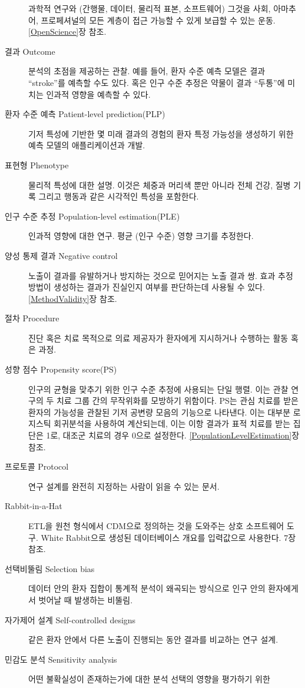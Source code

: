 \documentclass[10.5pt]{book}
\theoremstyle{definition}
\theoremstyle{definition}
\theoremstyle{definition}
\theoremstyle{remark}
\begin{document}
\begin{description}
과학적 연구와 (간행물, 데이터, 물리적 표본, 소프트웨어) 그것을 사회,
아마추어, 프로페셔널의 모든 계층이 접근 가능할 수 있게 보급할 수 있는
운동. \ref{OpenScience}장 참조.
\item[결과 Outcome]
분석의 초점을 제공하는 관찰. 예를 들어, 환자 수준 예측 모델은 결과
``stroke''를 예측할 수도 있다. 혹은 인구 수준 추정은 약물이 결과
``두통''에 미치는 인과적 영향을 예측할 수 있다.
\item[환자 수준 예측 Patient-level prediction(PLP)]
기저 특성에 기반한 몇 미래 결과의 경험의 환자 특정 가능성을 생성하기
위한 예측 모델의 애플리케이션과 개발.
\item[표현형 Phenotype]
물리적 특성에 대한 설명. 이것은 체중과 머리색 뿐만 아니라 전체 건강,
질병 기록 그리고 행동과 같은 시각적인 특성을 포함한다.
\item[인구 수준 추정 Population-level estimation(PLE)]
인과적 영향에 대한 연구. 평균 (인구 수준) 영향 크기를 추정한다.
\item[양성 통제 결과 Negative control]
노출이 결과를 유발하거나 방지하는 것으로 믿어지는 노출 결과 쌍. 효과
추정 방법이 생성하는 결과가 진실인지 여부를 판단하는데 사용될 수 있다.
\ref{MethodValidity}장 참조.
\item[절차 Procedure]
진단 혹은 치료 목적으로 의료 제공자가 환자에게 지시하거나 수행하는 활동
혹은 과정.
\item[성향 점수 Propensity score(PS)]
인구의 균형을 맞추기 위한 인구 수준 추정에 사용되는 단일 행렬. 이는 관찰
연구의 두 치료 그룹 간의 무작위화를 모방하기 위함이다. PS는 관심 치료를
받은 환자의 가능성을 관찰된 기저 공변량 모음의 기능으로 나타낸다. 이는
대부분 로지스틱 회귀분석을 사용하여 계산되는데, 이는 이항 결과가 표적
치료를 받는 집단은 1로, 대조군 치료의 경우 0으로 설정한다.
\ref{PopulationLevelEstimation}장 참조.
\item[프로토콜 Protocol]
연구 설계를 완전히 지정하는 사람이 읽을 수 있는 문서.
\item[Rabbit-in-a-Hat]
ETL을 원천 형식에서 CDM으로 정의하는 것을 도와주는 상호 소프트웨어 도구.
White Rabbit으로 생성된 데이터베이스 개요를 입력값으로 사용한다. 7장
참조.
\item[선택비뚤림 Selection bias]
데이터 안의 환자 집합이 통계적 분석이 왜곡되는 방식으로 인구 안의
환자에게서 벗어날 때 발생하는 비뚤림.
\item[자가제어 설계 Self-controlled designs]
같은 환자 안에서 다른 노출이 진행되는 동안 결과를 비교하는 연구 설계.
\item[민감도 분석 Sensitivity analysis]
어떤 불확실성이 존재하는가에 대한 분석 선택의 영향을 평가하기 위한

\end{description}
\end{document}
